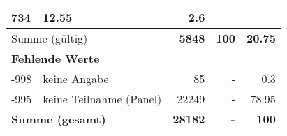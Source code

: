 \begin{longtable}{lXrrr}
       \num{734} &
       \num[round-mode=places,round-precision=2]{12,55} &
         \num[round-mode=places,round-precision=2]{2,6} \\
     \midrule
     \multicolumn{2}{l}{Summe (gültig)} &
       \textbf{\num{5848}} &
     \textbf{100} &
       \textbf{\num[round-mode=places,round-precision=2]{20,75}} \\
     \multicolumn{5}{l}{\textbf{Fehlende Werte}}\\
       -998 &
       keine Angabe &
         \num{85} &
        - &
         \num[round-mode=places,round-precision=2]{0,3} \\
       -995 &
       keine Teilnahme (Panel) &
         \num{22249} &
        - &
         \num[round-mode=places,round-precision=2]{78,95} \\
     \midrule
     \multicolumn{2}{l}{\textbf{Summe (gesamt)}} &
          \textbf{\num{28182}} &
        \textbf{-} &
        \textbf{100} \\
     \bottomrule
     \end{longtable}
     
